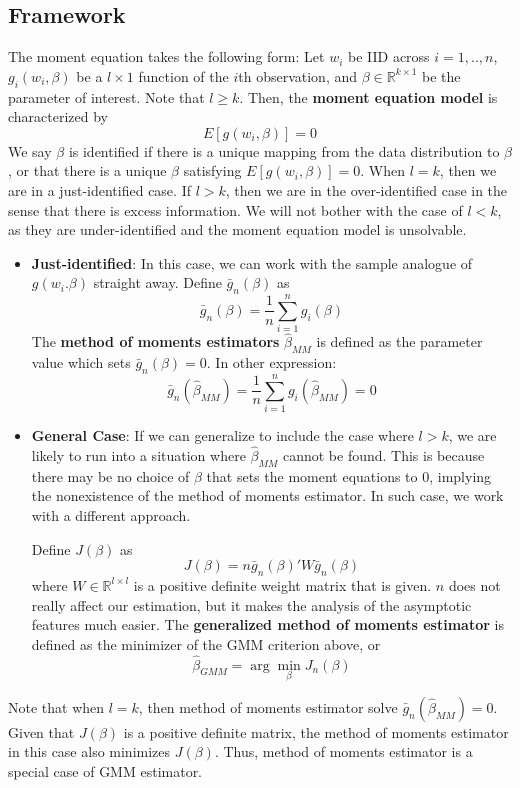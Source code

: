\documentclass[12pt]{article}
\theoremstyle{definition}
\theoremstyle{property}
\theoremstyle{assumption}
\theoremstyle{example}
\theoremstyle{comment}
\begin{document}
\subsection{Framework}
The moment equation takes the following form: Let $w_i$ be IID across $i=1,..,n$,  $g_i(w_i, \beta)$ be a $l\times1$ function of the $i$th observation, and $\beta\in\mathbb{R}^{k\times1}$ be the parameter of interest.  Note that $l\geq k$. Then, the \textbf{moment equation model} is characterized by
\[
E[g(w_i,\beta)]=0
\]
 We say $\beta$ is identified if there is a unique mapping from the data distribution to $\beta$, or that there is a unique $\beta$ satisfying $E[g(w_i,\beta)]=0$. When $l=k$, then we are in a just-identified case. If $l>k$, then we are in the over-identified case in the sense that there is excess information. We will not bother with the case of $l<k$, as they are under-identified and the moment equation model is unsolvable. \par
\begin{itemize}
\item \textbf{Just-identified}: In this case, we can work with the sample analogue of $g(w_i.\beta)$ straight away. Define $\bar{g}_n(\beta)$ as 
\[
\bar{g}_n(\beta)=\frac{1}{n}\sum_{i=1}^ng_i(\beta)
\]
The \textbf{method of moments estimators} $\hat{\beta}_{MM}$ is defined as the parameter value which sets $\bar{g}_n(\beta)=0$. In other expression:
\[
\bar{g}_n(\hat{\beta}_{MM})=\frac{1}{n}\sum_{i=1}^ng_i(\hat{\beta}_{MM})=0
\] 
\item \textbf{General Case}: If we can generalize to include the case where $l>k$, we are likely to run into a situation where $\hat{\beta}_{MM}$ cannot be found. This is because there may be no choice of $\beta$ that sets the moment equations to 0, implying the nonexistence of the method of moments estimator. In such case, we work with a different approach. 
\par
Define $J(\beta)$ as
\[
J(\beta)=n \bar{g}_n(\beta)'W\bar{g}_n(\beta)
\]
where $W\in\mathbb{R}^{l\times l}$ is a positive definite weight matrix that is given. $n$ does not really affect our estimation, but it makes the analysis of the asymptotic features much easier. The \textbf{generalized method of moments estimator} is defined as the minimizer of the GMM criterion above, or
\[
\hat{\beta}_{GMM}=\arg\min_\beta J_n(\beta)
\]
\end{itemize}\par
Note that when $l=k$, then method of moments estimator solve $\bar{g}_n(\hat{\beta}_{MM})=0$. Given that $J(\beta)$ is a positive definite matrix, the method of moments estimator in this case also minimizes $J(\beta)$. Thus, method of moments estimator is a special case of GMM estimator. \par
\end{document}
